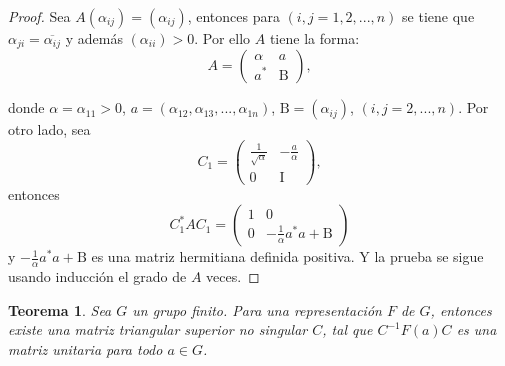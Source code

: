 \documentclass[12pt]{book}
\newtheorem{theorem}{Teorema}[section]
\theoremstyle{definition}
\newcounter{in}
\newcounter{ini}
\begin{document}
\begin{proof}
  Sea $A\left(\alpha_{ij}\right)=(\alpha_{ij})$, entonces para
  $\left(i,j=1,2,...,n\right)$ se tiene que
  $\alpha_{ji}=\overline{\alpha_{ij}}$ y además
  $\left(\alpha_{ii}\right)>0$. Por ello $A$ tiene la forma:
  \begin{equation}
    \label{eq:2}
     A=
     \begin{pmatrix}
    \alpha & a \\ 
    a^{*} & \mathrm{B}
  \end{pmatrix},
  \end{equation} 

  donde $\alpha=\alpha_{11}>0$,
  $ a= \left(\alpha_{12},\alpha_{13},...,\alpha_{1n} \right) $,
  $ \mathrm{B}=\left(\alpha_{ij}\right)$,
  $ \left(i,j=2,...,n\right) $. Por otro lado, sea
\begin{equation}
  \label{eq:3}
  C_{1}=
  \begin{pmatrix}
    \frac{1}{\sqrt{\alpha}} & -\frac{a}{\alpha} \\ 
    0 & \mathrm{I}
  \end{pmatrix},
\end{equation}
entonces 
\begin{equation}
   \label{eq:4}
  C_{1}^{*}AC_{1} =
  \begin{pmatrix}
    1 & 0 \\ 
    0 & -\frac{1}{\alpha}a^{*}a+\mathrm{B}
  \end{pmatrix}
\end{equation}  
y $-\frac{1}{\alpha}a^{*}a+\mathrm{B}$ es una matriz hermitiana
definida positiva. Y la prueba se sigue usando inducción el grado de
$A$ veces.
\end{proof}

\begin{theorem}
  \label{t2_3}
  Sea $G$ un grupo finito. Para una representación $F$ de $G$,
  entonces existe una matriz triangular superior no singular $C$,
  tal que $C^{-1}F\left(a\right)C$ es una matriz unitaria para todo
  $a \in G$.
\end{theorem}
\end{document}

